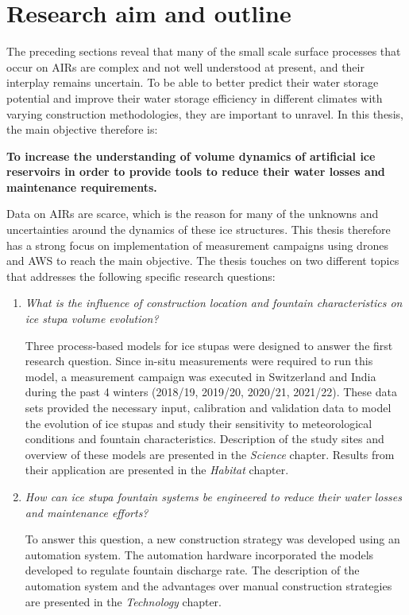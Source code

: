 \section{Research aim and outline}

The preceding sections reveal that many of the small scale surface processes that occur on \ac{AIRs} are complex
and not well understood at present, and their interplay remains uncertain. To be able to better predict their
water storage potential and improve their water storage efficiency in different climates with varying
construction methodologies, they are important to unravel. In this thesis, the main objective therefore is:

\begin{thesis_quotation}

  \textbf{To increase the understanding of volume dynamics of artificial ice reservoirs in order to
  provide tools to reduce their water losses and maintenance requirements.}

\end{thesis_quotation}

Data on \ac{AIRs} are scarce, which is the reason for many of the unknowns and uncertainties around the dynamics
of these ice structures. This thesis therefore has a strong focus on implementation of measurement campaigns
using drones and \ac{AWS} to reach the main objective. The thesis touches on two different topics that
addresses the following specific research questions:

\begin{enumerate}

  \item \textit{What is the influence of construction location and fountain characteristics on ice stupa volume
    evolution?}

Three process-based models for ice stupas were designed to answer the first research question. Since in-situ
    measurements were required to run this model, a measurement campaign was executed in Switzerland and India
    during the past 4 winters (2018/19, 2019/20, 2020/21, 2021/22). These data sets provided the necessary
    input, calibration and validation data to model the evolution of ice stupas and study their sensitivity to
    meteorological conditions and fountain characteristics. Description of the study sites and overview of these
    models are presented in the \textit{Science} chapter. Results from their application are presented in the
    \textit{Habitat} chapter.

  \item \textit{How can ice stupa fountain systems be engineered to reduce their water losses and maintenance
    efforts?}

To answer this question, a new construction strategy was developed using an automation system. The automation
    hardware incorporated the models developed to regulate fountain discharge rate. The description of the
    automation system and the advantages over manual construction strategies are presented in the
    \textit{Technology} chapter.

\end{enumerate}

